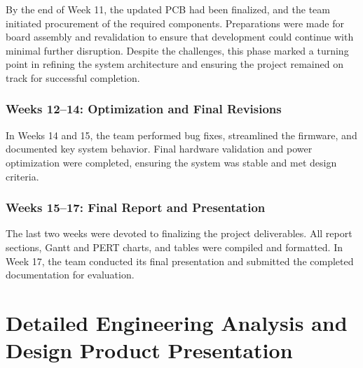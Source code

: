 \documentclass[12pt]{article}
\begin{document}
By the end of Week 11, the updated PCB had been finalized, and the team initiated procurement of the required components. Preparations were made for board assembly and revalidation to ensure that development could continue with minimal further disruption. Despite the challenges, this phase marked a turning point in refining the system architecture and ensuring the project remained on track for successful completion.

\subsubsection*{Weeks 12–14: Optimization and Final Revisions}
In Weeks 14 and 15, the team performed bug fixes, streamlined the firmware, and documented key system behavior. Final hardware validation and power optimization were completed, ensuring the system was stable and met design criteria.

\subsubsection*{Weeks 15–17: Final Report and Presentation}
The last two weeks were devoted to finalizing the project deliverables. All report sections, Gantt and PERT charts, and tables were compiled and formatted. In Week 17, the team conducted its final presentation and submitted the completed documentation for evaluation.

\section{Detailed Engineering Analysis and Design Product Presentation}
\end{document}
